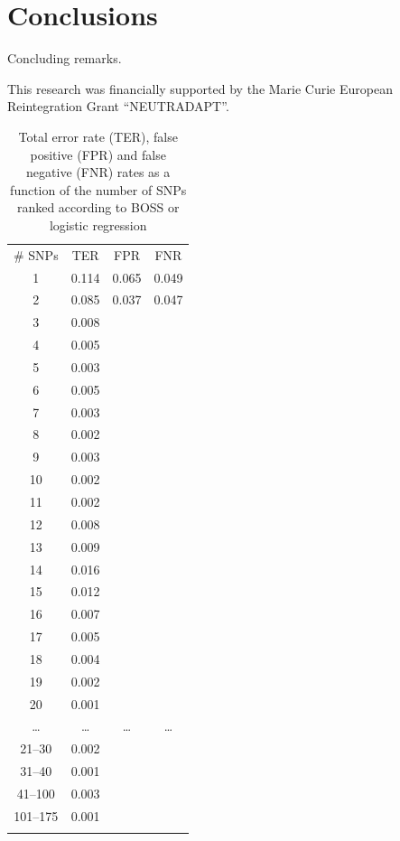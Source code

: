 \section{Conclusions}
\label{sec:conclusions}

Concluding remarks. 


\begin{acknowledgements}
This research was financially supported by the Marie Curie European
Reintegration Grant ``NEUTRADAPT''.
\end{acknowledgements}


\begin{table}
\caption{Total error rate (TER), false positive (FPR) and false negative
  (FNR) rates as a function of the number of SNPs ranked according to
  BOSS or logistic regression}
\label{tab:error}       %
\begin{tabular}{cccc}
\hline\noalign{\smallskip}
\# SNPs & TER & FPR & FNR \\
\noalign{\smallskip}\hline\noalign{\smallskip}
1 & 0.114 & 0.065 & 0.049 \\
2 & 0.085 & 0.037 & 0.047 \\
3 & 0.008 &  &  \\
4 & 0.005 &  &  \\
5 & 0.003 &  &  \\
6 & 0.005 &  &  \\
7 & 0.003 &  &  \\
8 & 0.002 &  &  \\
9 & 0.003 &  &  \\
10 & 0.002 &  &  \\
11 & 0.002 &  &  \\
12 & 0.008 &  &  \\
13 & 0.009 &  &  \\
14 & 0.016 &  &  \\
15 & 0.012 &  &  \\
16 & 0.007 &  &  \\
17 & 0.005 &  &  \\
18 & 0.004 &  &  \\
19 & 0.002 &  &  \\
20 & 0.001 &  &  \\
\dots & \dots &  \dots &  \dots \\
21--30 & 0.002  &  &  \\
31--40 & 0.001 &  &  \\
41--100 & 0.003 &  &  \\
101--175 & 0.001 &  &  \\
\noalign{\smallskip}\hline
\end{tabular}
\end{table}


